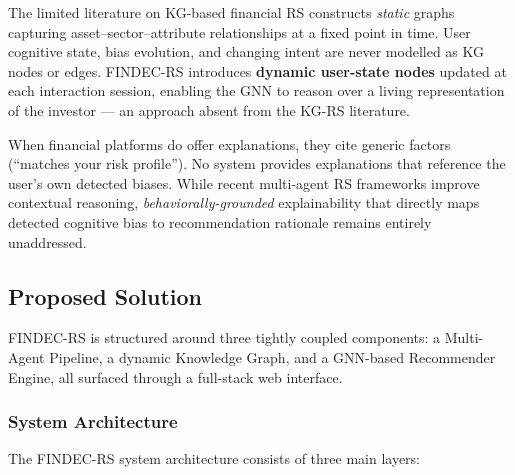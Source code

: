 \documentclass[12pt, a4paper]{article}
\begin{document}
\begin{tcolorbox}[gapbox, title={\faSitemap\ Gap 3 --- Static Knowledge Graphs in Financial RS}]
The limited literature on KG-based financial RS constructs \textit{static} graphs
capturing asset--sector--attribute relationships at a fixed point in time. User cognitive
state, bias evolution, and changing intent are never modelled as KG nodes or edges.
FINDEC-RS introduces \textbf{dynamic user-state nodes} updated at each interaction session,
enabling the GNN to reason over a living representation of the investor --- an approach
absent from the KG-RS literature.
\end{tcolorbox}

\begin{tcolorbox}[gapbox, title={\faComments\ Gap 4 --- Absence of Behaviorally-Grounded Explainability}]
When financial platforms do offer explanations, they cite generic factors
(``matches your risk profile''). No system provides explanations that reference the user's
own detected biases. While recent multi-agent RS frameworks improve contextual reasoning,
\textit{behaviorally-grounded} explainability that directly maps detected cognitive bias
to recommendation rationale remains entirely unaddressed.
\end{tcolorbox}

\subsection{Proposed Solution}

FINDEC-RS is structured around three tightly coupled components: a Multi-Agent Pipeline,
a dynamic Knowledge Graph, and a GNN-based Recommender Engine, all surfaced through a
full-stack web interface.

\subsubsection{System Architecture}

The FINDEC-RS system architecture consists of three main layers:
\end{document}

